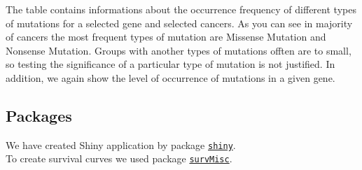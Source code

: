 The table contains informations about the occurrence frequency of
different types of mutations for a selected gene and selected cancers.
As you can see in majority of cancers the most frequent types of
mutation are Missense Mutation and Nonsense Mutation. Groups with
another types of mutations offten are to small, so testing the
significance of a particular type of mutation is not justified. In
addition, we again show the level of occurrence of mutations in a given
gene.

\subsection{Packages}
We have created Shiny application by package \href{http://shiny.rstudio.com/}{\nolinkurl{shiny}}. \\
To create survival curves we used package \href{http://www.rdocumentation.org/packages/survMisc}{\nolinkurl{survMisc}}.



\address{%
Marlena Bielat, \href{bielat.marlena@gmail.com}{\nolinkurl{bielat.marlena@gmail.com}}\\
Małgorzata Dobkowska, \href{gosia.dobkowska@tlen.pl}{\nolinkurl{gosia.dobkowska@tlen.pl}} \\
Sebastian Gargas, \href{gargass@student.mini.pw.edu.pl}{\nolinkurl{gargass@student.mini.pw.edu.pl}}\\
MiNI Warsaw University of Technology\\
\\
}




